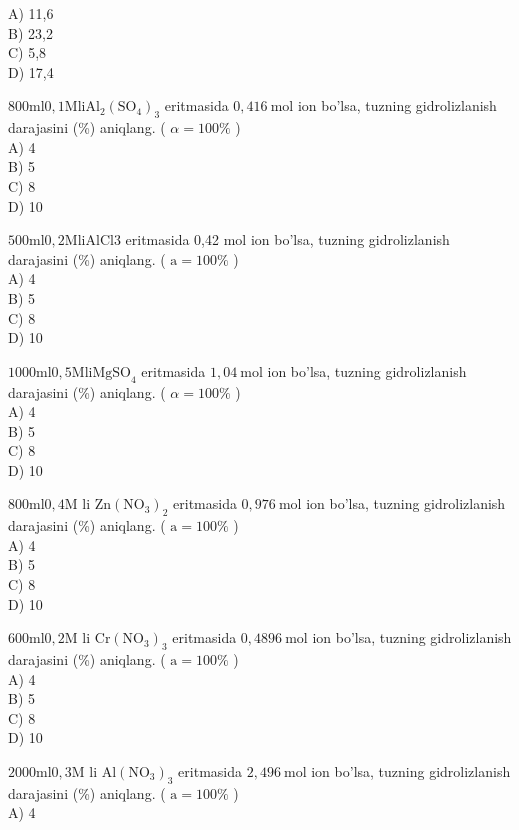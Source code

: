 A) 11,6\\
B) 23,2\\
C) 5,8\\
D) 17,4
  \item $800 \mathrm{ml} 0,1 \mathrm{M} \mathrm{li} \mathrm{Al}{ }_{2}\left(\mathrm{SO}_{4}\right)_{3}$ eritmasida $0,416 \mathrm{~mol}$ ion bo'lsa, tuzning gidrolizlanish darajasini (\%) aniqlang. ( $\alpha=100 \%$ )\\
A) 4\\
B) 5\\
C) 8\\
D) 10
  \item $500 \mathrm{ml} 0,2 \mathrm{M} \mathrm{li} \mathrm{AlCl} 3$ eritmasida 0,42 mol ion bo'lsa, tuzning gidrolizlanish darajasini (\%) aniqlang. ( $\mathrm{a}=100 \%$ )\\
A) 4\\
B) 5\\
C) 8\\
D) 10
  \item $1000 \mathrm{ml} 0,5 \mathrm{M} \mathrm{li} \mathrm{MgSO}_{4}$ eritmasida $1,04 \mathrm{~mol}$ ion bo'lsa, tuzning gidrolizlanish darajasini (\%) aniqlang. ( $\alpha=100 \%$ )\\
A) 4\\
B) 5\\
C) 8\\
D) 10
  \item $800 \mathrm{ml} 0,4 \mathrm{M}$ li $\mathrm{Zn}\left(\mathrm{NO}_{3}\right)_{2}$ eritmasida $0,976 \mathrm{~mol}$ ion bo'lsa, tuzning gidrolizlanish darajasini (\%) aniqlang. ( $\mathrm{a}=100 \%$ )\\
A) 4\\
B) 5\\
C) 8\\
D) 10
  \item $600 \mathrm{ml} 0,2 \mathrm{M}$ li $\mathrm{Cr}\left(\mathrm{NO}_{3}\right)_{3}$ eritmasida $0,4896 \mathrm{~mol}$ ion bo'lsa, tuzning gidrolizlanish darajasini (\%) aniqlang. ( $\mathrm{a}=100 \%$ )\\
A) 4\\
B) 5\\
C) 8\\
D) 10
  \item $2000 \mathrm{ml} 0,3 \mathrm{M}$ li $\mathrm{Al}\left(\mathrm{NO}_{3}\right)_{3}$ eritmasida $2,496 \mathrm{~mol}$ ion bo'lsa, tuzning gidrolizlanish darajasini (\%) aniqlang. ( $\mathrm{a}=100 \%$ )\\
A) 4\\
